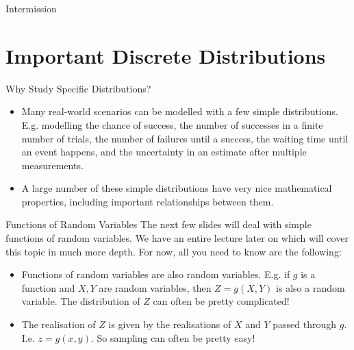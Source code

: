 \documentclass[10pt]{beamer}
\begin{document}
\begin{frame}[standout]
Intermission
\end{frame}

\section{Important Discrete Distributions}

\begin{frame}[fragile]{Why Study Specific Distributions?}
\begin{itemize}[<+->]
    \item Many real-world scenarios can be modelled with a few simple distributions. E.g. modelling the chance of success, the number of successes in a finite number of trials, the number of failures until a success, the waiting time until an event happens, and the uncertainty in an estimate after multiple measurements.
    \item A large number of these simple distributions have very nice mathematical properties, including important relationships between them.
\end{itemize}

\end{frame}

\begin{frame}[fragile]{Functions of Random Variables}
The next few slides will deal with simple functions of random variables. We have an entire lecture later on which will cover this topic in much more depth. For now, all you need to know are the following:
\begin{itemize}[<+->]
    \item Functions of random variables are also random variables. E.g. if \(g\) is a function and \(X, Y\) are random variables, then \(Z = g\left(X, Y\right)\) is also a random variable. The distribution of \(Z\) can often be pretty complicated!
    \item The realisation of \(Z\) is given by the realisations of \(X\) and \(Y\) passed through \(g\). I.e. \(z = g\left(x, y\right)\). So sampling can often be pretty easy!
\end{itemize}
\end{frame}
\end{document}
